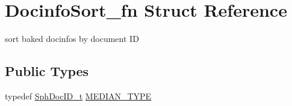 \hypertarget{structDocinfoSort__fn}{\section{Docinfo\-Sort\-\_\-fn Struct Reference}
\label{structDocinfoSort__fn}
}


sort baked docinfos by document I\-D  


\subsection*{Public Types}
\begin{DoxyCompactItemize}
\item 
typedef \hyperlink{sphinx_8h_a3176771631c12a9e4897272003e6b447}{Sph\-Doc\-I\-D\-\_\-t} \hyperlink{structDocinfoSort__fn_a6b8a50bde479cf4599c3a820a6db042e}{M\-E\-D\-I\-A\-N\-\_\-\-T\-Y\-P\-E}
\end{DoxyCompactItemize}
